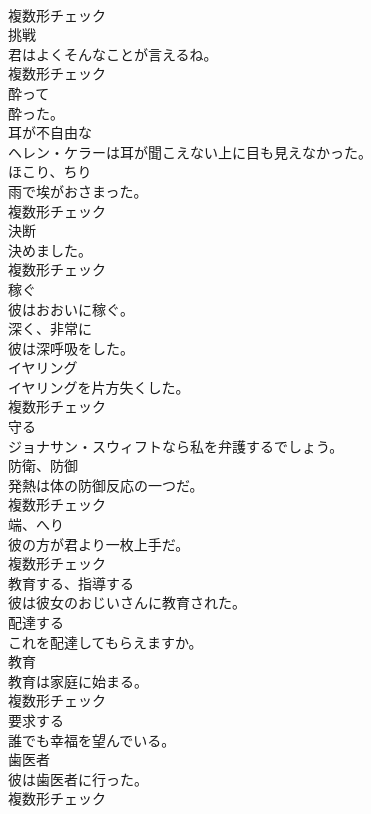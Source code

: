 \documentclass[8pt]{extreport}
\begin{document}
\begin{CJK}{UTF8}{min}
\\	複数形チェック
\\	[名詞]	挑戦	
\\	君はよくそんなことが言えるね。	
\\	複数形チェック
\\	[形容詞]	酔って	
\\	酔った。	
\\	[形容詞]	耳が不自由な	
\\	ヘレン・ケラーは耳が聞こえない上に目も見えなかった。	
\\	[名詞]	ほこり、ちり	
\\	雨で埃がおさまった。	
\\	複数形チェック
\\	[名詞]	決断	
\\	決めました。	
\\	複数形チェック
\\	[動詞]	稼ぐ	
\\	彼はおおいに稼ぐ。	
\\	[副詞]	深く、非常に	
\\	彼は深呼吸をした。	
\\	[名詞]	イヤリング	
\\	イヤリングを片方失くした。	
\\	複数形チェック
\\	[動詞]	守る	
\\	ジョナサン・スウィフトなら私を弁護するでしょう。	
\\	[名詞]	防衛、防御	
\\	発熱は体の防御反応の一つだ。	
\\	複数形チェック
\\	[名詞]	端、へり	
\\	彼の方が君より一枚上手だ。	
\\	複数形チェック
\\	[動詞]	教育する、指導する	
\\	彼は彼女のおじいさんに教育された。	
\\	[動詞]	配達する	
\\	これを配達してもらえますか。	
\\	[名詞]	教育	
\\	教育は家庭に始まる。	
\\	複数形チェック
\\	[動詞]	要求する	
\\	誰でも幸福を望んでいる。	
\\	[名詞]	⻭医者	
\\	彼は歯医者に行った。	
\\	複数形チェック

\end{CJK}
\end{document}

